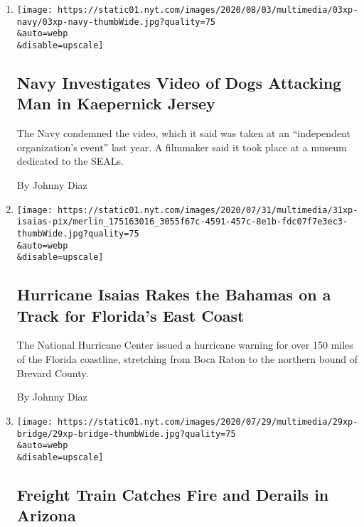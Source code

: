 \begin{enumerate}
\def\labelenumi{\arabic{enumi}.}
\item
  \href{/2020/08/03/us/navy-seal-museum-kaepernick.html}{}

  \texttt{[image: https://static01.nyt.com/images/2020/08/03/multimedia/03xp-navy/03xp-navy-thumbWide.jpg?quality=75\\\&auto=webp\\\&disable=upscale]}

  \hypertarget{navy-investigates-video-of-dogs-attacking-man-in-kaepernick-jersey}{%
  \subsection{Navy Investigates Video of Dogs Attacking Man in
  Kaepernick
  Jersey}\label{navy-investigates-video-of-dogs-attacking-man-in-kaepernick-jersey}}

  The Navy condemned the video, which it said was taken at an
  ``independent organization's event'' last year. A filmmaker said it
  took place at a museum dedicated to the SEALs.

  By Johnny Diaz
\item
  \href{/2020/07/31/us/hurricane-isaias.html}{}

  \texttt{[image: https://static01.nyt.com/images/2020/07/31/multimedia/31xp-isaias-pix/merlin\_175163016\_3055f67c-4591-457c-8e1b-fdc07f7e3ec3-thumbWide.jpg?quality=75\\\&auto=webp\\\&disable=upscale]}

  \hypertarget{hurricane-isaias-rakes-the-bahamas-on-a-track-for-floridas-east-coast}{%
  \subsection{Hurricane Isaias Rakes the Bahamas on a Track for
  Florida's East
  Coast}\label{hurricane-isaias-rakes-the-bahamas-on-a-track-for-floridas-east-coast}}

  The National Hurricane Center issued a hurricane warning for over 150
  miles of the Florida coastline, stretching from Boca Raton to the
  northern bound of Brevard County.

  By Johnny Diaz
\item
  \href{/2020/07/29/us/tempe-train-bridge-fire.html}{}

  \texttt{[image: https://static01.nyt.com/images/2020/07/29/multimedia/29xp-bridge/29xp-bridge-thumbWide.jpg?quality=75\\\&auto=webp\\\&disable=upscale]}

  \hypertarget{freight-train-catches-fire-and-derails-in-arizona}{%
  \subsection{Freight Train Catches Fire and Derails in
  Arizona}\label{freight-train-catches-fire-and-derails-in-arizona}}


\end{enumerate}
